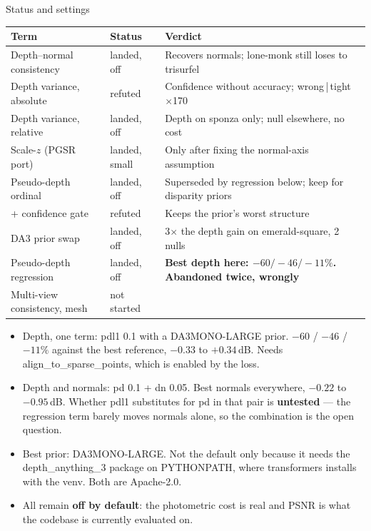 \documentclass[aspectratio=169,9pt]{beamer}
\makeatletter
\newcommand{\up}[1]{\textcolor{good}{#1}}
\newcommand{\dn}[1]{\textcolor{bad}{#1}}
\newcommand{\code}[1]{{\ttfamily\fontsize{0.92\f@size}{\f@baselineskip}\selectfont #1}}
\makeatother
\begin{document}
\begin{frame}{Status and settings}
  \begin{center}\small
  \begin{tabular}{lll}
    \toprule
    Term & Status & Verdict \\
    \midrule
    Depth--normal consistency & \up{landed}, off & Recovers normals; \code{lone-monk} still loses to \code{trisurfel} \\
    Depth variance, absolute & \dn{refuted} & Confidence without accuracy; \code{wrong\,|\,tight} $\times$170 \\
    Depth variance, relative & \up{landed}, off & Depth on \code{sponza} only; null elsewhere, no cost \\
    Scale-$z$ (PGSR port) & \up{landed}, small & Only after fixing the normal-axis assumption \\
    Pseudo-depth ordinal & \up{landed}, off & Superseded by regression below; keep for disparity priors \\
    \quad + confidence gate & \dn{refuted} & Keeps the prior's worst structure \\
    \quad DA3 prior swap & \up{landed}, off & 3$\times$ the depth gain on \code{emerald-square}, 2 nulls \\
    Pseudo-depth regression & \up{landed}, off & \textbf{Best depth here: $-60/-46/-11\%$. Abandoned twice, wrongly} \\
    Multi-view consistency, mesh & not started & \\
    \bottomrule
  \end{tabular}
  \end{center}
  \vspace{0.6em}
  \begin{itemize}\small
    \item Depth, one term: \code{pdl1 0.1} with a \code{DA3MONO-LARGE} prior. $-60$ / $-46$ /
          $-11\%$ against the best reference, $-0.33$ to $+0.34$\,dB. Needs
          \code{align\_to\_sparse\_points}, which is enabled by the loss.
    \item Depth and normals: \code{pd 0.1 + dn 0.05}. Best normals everywhere, $-0.22$ to $-0.95$\,dB.
          Whether \code{pdl1} substitutes for \code{pd} in that pair is \textbf{untested} --- the
          regression term barely moves normals alone, so the combination is the open question.
    \item Best prior: \code{DA3MONO-LARGE}. Not the default only because it needs the
          \code{depth\_anything\_3} package on \code{PYTHONPATH}, where \code{transformers}
          installs with the venv. Both are Apache-2.0.
    \item All remain \textbf{off by default}: the photometric cost is real and PSNR is what the
          codebase is currently evaluated on.
  \end{itemize}
\end{frame}
\end{document}
